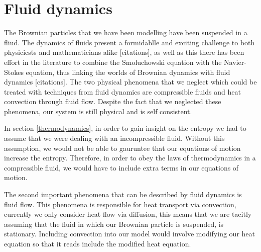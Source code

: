 \section{Fluid dynamics}
The Brownian particles that we have been modelling have been suspended in a fliud. The dynamics of fluids present a formidablle and exciting challenge to both physicicsts and mathematicians alike {\color{red} [citations]}, as well as this there has been effort in the literature to combine the Smoluchowski equation with the Navier-Stokes equation, thus linking the worlds of Brownian dynamics with fluid dynamics {\color{red} [citations]}. The two physical phenomena that we neglect which could be treated with techniques from fluid dynamics are compressible fluids and heat convection through fluid flow. Despite the fact that we neglected these phenomena, our system is still physical and is self consistent.

In section \ref{thermodynamics}, in order to gain insight on the entropy we had to assume that we were dealing with an incompressible fluid. Without this assumption, we would not be able to gauruntee that our equations of motion
increase the entropy. Therefore, in order to obey the laws of thermodynamics in a compressible fluid, we would have to include extra terms in our equations of motion.

The second important phenomena that can be described by fluid dynamics is fluid flow. This phenomena is responsible for heat transport via convection, currently we only consider heat flow via diffusion, this means that we are tacitly assuming that the fluid in which our Brownian particle is suspended, is stationary. Including convection into our model would involve modifying our heat equation so that it reads {\color{red} include the modified heat equation}.
